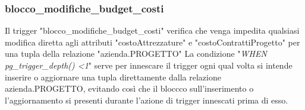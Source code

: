     \newpage

    \subsubsection{blocco\_modifiche\_budget\_costi}
    Il trigger "blocco\_modifiche\_budget\_costi" verifica che venga impedita qualsiasi modifica diretta agli attributi
    "costoAttrezzature" e "costoContrattiProgetto" per una tupla della relazione "azienda.PROGETTO"
    La condizione "\textit{WHEN pg\_trigger\_depth() \textless 1}" serve per innescare il trigger ogni qual volta si intende inserire o aggiornare una tupla direttamente dalla relazione azienda.PROGETTO,
    evitando così che il bloccco sull'inserimento o l'aggiornamento si presenti durante l'azione di trigger innescati prima di esso.

    \ttfamily
